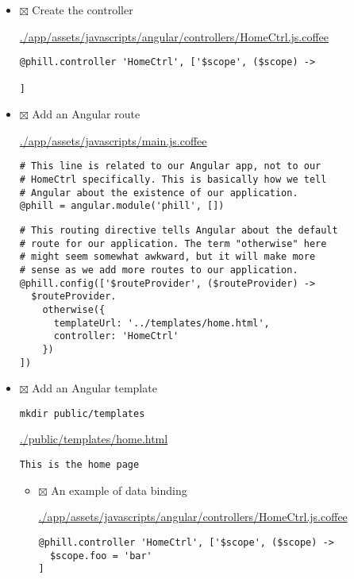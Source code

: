 \documentclass[11pt]{article}
\begin{document}
\begin{itemize}
\begin{itemize}
\begin{itemize}
\begin{itemize}
\begin{itemize}
\item $\boxtimes$ Create the controller

\url{./app/assets/javascripts/angular/controllers/HomeCtrl.js.coffee}

\begin{verbatim}
@phill.controller 'HomeCtrl', ['$scope', ($scope) ->

]
\end{verbatim}

\item $\boxtimes$ Add an Angular route

\url{./app/assets/javascripts/main.js.coffee}

\begin{verbatim}
# This line is related to our Angular app, not to our
# HomeCtrl specifically. This is basically how we tell
# Angular about the existence of our application.
@phill = angular.module('phill', [])
\end{verbatim}

\begin{verbatim}
# This routing directive tells Angular about the default
# route for our application. The term "otherwise" here
# might seem somewhat awkward, but it will make more
# sense as we add more routes to our application.
@phill.config(['$routeProvider', ($routeProvider) ->
  $routeProvider.
    otherwise({
      templateUrl: '../templates/home.html',
      controller: 'HomeCtrl'
    }) 
])
\end{verbatim}

\item $\boxtimes$ Add an Angular template

\begin{verbatim}
mkdir public/templates
\end{verbatim}

\url{./public/templates/home.html}

\begin{verbatim}
This is the home page
\end{verbatim}

\begin{itemize}
\item $\boxtimes$ An example of data binding

\url{./app/assets/javascripts/angular/controllers/HomeCtrl.js.coffee}

\begin{verbatim}
@phill.controller 'HomeCtrl', ['$scope', ($scope) ->
  $scope.foo = 'bar'        
]
\end{verbatim}


\end{itemize}
\end{itemize}
\end{itemize}
\end{itemize}
\end{itemize}
\end{itemize}
\end{document}

